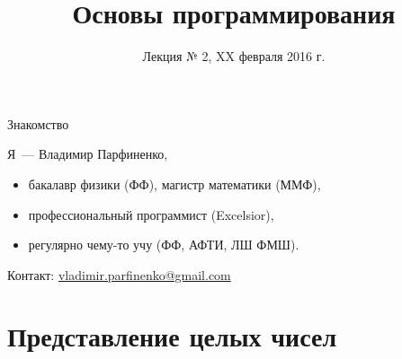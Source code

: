 %



\usepackage{pgfpages}

\usepackage{listings}

\newcommand{\reduceBlockEqSpacing}{%
  \vspace*{-\baselineskip}\setlength\belowdisplayshortskip{0pt}%
}

\usepackage{numprint}
\newcommand{\num}[1]{\numprint{#1}}
  \npthousandsep{\,}
  \npthousandthpartsep{}
  \npdecimalsign{,}

\newcommand{\pcnum}[1]{\ensuremath{\mathtt{#1}}}
\newcommand{\bin}[1]{\pcnum{#1}_2}
\newcommand{\hex}[1]{\pcnum{#1}_{16}}

\newcommand{\code}[1]{\texttt{#1}}

\title{Основы программирования}
\subtitle{Лекция № 2, XX февраля 2016 г.}
\date{}




\begin{frame}[plain]
  \titlepage
\end{frame}

\begin{frame}{Знакомство}

  Я~--- Владимир Парфиненко,

  \begin{itemize}
    \item бакалавр физики (ФФ), магистр математики (ММФ),
    \item профессиональный программист (Excelsior),
    \item регулярно чему-то учу (ФФ, АФТИ, ЛШ ФМШ).
  \end{itemize}

  Контакт:
  \href{mailto:vladimir.parfinenko@gmail.com}{vladimir.parfinenko@gmail.com}

\end{frame}

\section{Представление целых чисел}

